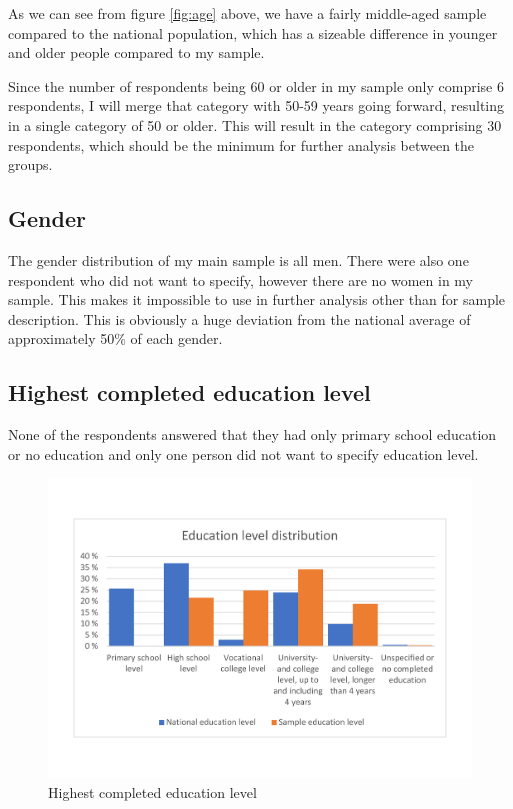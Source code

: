 As we can see from figure \ref{fig:age} above, we have a fairly middle-aged sample compared to the national population, which has a sizeable difference in younger and older people compared to my sample. 

Since the number of respondents being 60 or older in my sample only comprise 6 respondents, I will merge that category with 50-59 years going forward, resulting in a single category of 50 or older. This will result in the category comprising 30 respondents, which should be the minimum for further analysis between the groups. 

\subsection{Gender}
The gender distribution of my main sample is all men. There were also one respondent who did not want to specify, however there are no women in my sample. This makes it impossible to use in further analysis other than for sample description. This is obviously a huge deviation from the national average of approximately 50\% of each gender. 


\subsection{Highest completed education level}
None of the respondents answered that they had only primary school education or no education and only one person did not want to specify education level. 

\begin{figure}[H]
    \centering
    \includegraphics[scale=0.45]{figures/diagrams/education_ssb.pdf}
    \caption{Highest completed education level}
    \label{fig:education}
\end{figure}

